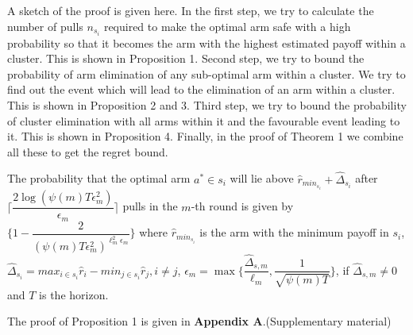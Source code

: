 \begin{remark}
A sketch of the proof is given here. In the first step, we try to calculate the number of pulls $n_{s_{i}}$ required to make the optimal arm  safe with a high probability so that it becomes the arm with the highest estimated payoff within a cluster. This is shown in Proposition 1. Second step, we try to bound the probability of arm elimination of any sub-optimal arm within a cluster. We try to find out the event which will lead to the elimination of an arm within a cluster. This is shown in Proposition 2 and 3. Third step, we try to bound the probability of cluster elimination with all arms within it and the favourable event leading to it. This is shown in Proposition 4. Finally, in the proof of Theorem 1 we combine all these to get the regret bound.  
\end{remark}
	
\begin{proposition}
The probability that the optimal arm $a^{*}\in s_{i}$ will lie above $\hat{r}_{min_{s_{i}}}+ \hat{\Delta}_{s_{i}}$ after $\bigg\lceil\dfrac{2\log (\psi(m)T\epsilon_{m}^{2})}{\epsilon_{m}}\bigg\rceil$ pulls in the $m$-th round is given by $\bigg\lbrace 1- \dfrac{2}{(\psi(m)T\epsilon_{m}^{2})^{\ell_{m}^{2}\epsilon_{m}}} \bigg\rbrace$ where $\hat{r}_{min_{s_{i}}}$ is the arm with the minimum payoff in $s_{i}$, $\hat{\Delta}_{s_{i}}=max_{i\in s_{i}}\hat{r}_{i}-min_{j\in s_{i}}\hat{r}_{j}, i\neq j$, $\epsilon_{m}=\max{\bigg\lbrace\dfrac{\hat{\Delta}_{s,m}}{\ell_{m}}, \dfrac{1}{\sqrt{\psi{(m)T}}}\bigg\rbrace}$, if $\hat{\Delta}_{s,m}\neq 0$ and $T$ is the horizon. 
\end{proposition}

	The proof of Proposition 1 is given in \textbf{Appendix A}.(Supplementary material)

